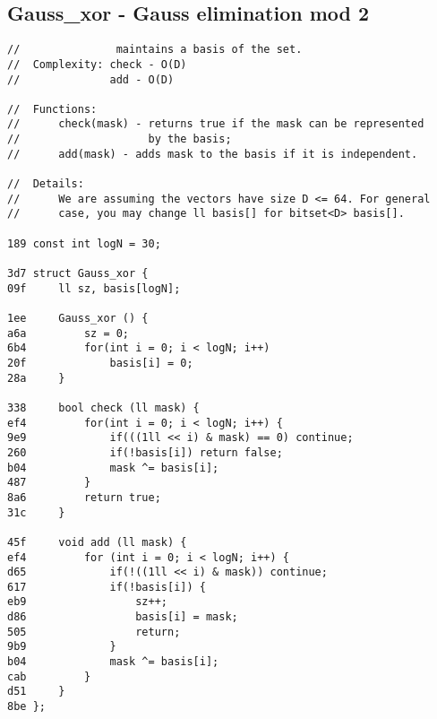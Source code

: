 \documentclass[11pt, a4paper, twoside]{article}
\begin{document}
\subsection{ Gauss_xor - Gauss elimination mod 2}
\begin{lstlisting}
//               maintains a basis of the set.
//  Complexity: check - O(D)
//              add - O(D)

//  Functions:
//      check(mask) - returns true if the mask can be represented
//                    by the basis;
//      add(mask) - adds mask to the basis if it is independent.

//  Details:
//      We are assuming the vectors have size D <= 64. For general
//      case, you may change ll basis[] for bitset<D> basis[].

189 const int logN = 30;

3d7 struct Gauss_xor {
09f     ll sz, basis[logN];
    
1ee     Gauss_xor () {
a6a         sz = 0;
6b4         for(int i = 0; i < logN; i++)
20f             basis[i] = 0;
28a     }
    
338     bool check (ll mask) {
ef4         for(int i = 0; i < logN; i++) {
9e9             if(((1ll << i) & mask) == 0) continue;
260             if(!basis[i]) return false;
b04             mask ^= basis[i];
487         }
8a6         return true;
31c     }
    
45f     void add (ll mask) {
ef4         for (int i = 0; i < logN; i++) {
d65             if(!((1ll << i) & mask)) continue;
617             if(!basis[i]) {
eb9                 sz++;
d86                 basis[i] = mask;
505                 return;
9b9             }
b04             mask ^= basis[i];
cab         }
d51     }
8be };
\end{lstlisting}
\end{document}
